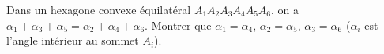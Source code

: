 Dans un hexagone convexe équilatéral $A_1A_2A_3A_4A_5A_6$, on a $\alpha_1 + \alpha_3 + \alpha_5 = \alpha_2 + \alpha_4 + \alpha_6$. Montrer que $\alpha_1 = \alpha_4$, $\alpha_2 = \alpha_5$, $\alpha_3 = \alpha_6$ ($\alpha_i$ est l'angle intérieur au sommet $A_i$).
